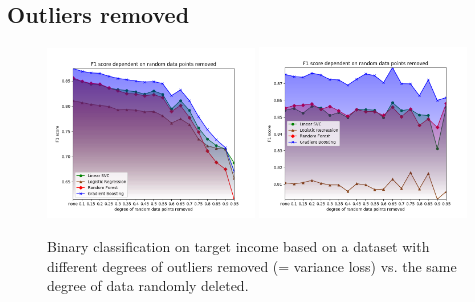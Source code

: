 \documentclass{llncs}
\begin{document}


\subsection{Outliers removed}
\label{ssect:outliers_removed}

\begin{figure}[!h]
	\centering
	\includegraphics[width=0.49\textwidth]{figures/outliers/outliers_removed_all_algos_blur_bright}
	\includegraphics[width=0.49\textwidth]{figures/outliers/randomly_removed_points_all_algos_blur_bright}
	\caption{Binary classification on target income based on a dataset with different degrees of outliers removed (= variance loss) vs. the same degree of data randomly deleted.}
	\label{fig:results_outliers_removed}
\end{figure}
\end{document}
